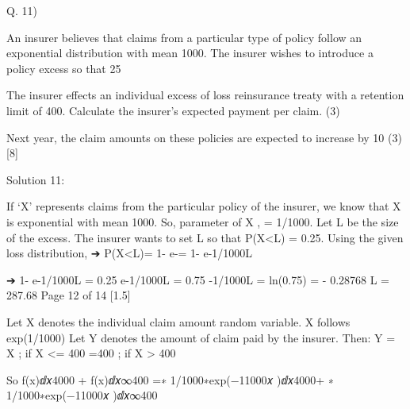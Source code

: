 \documentclass[a4paper,12pt]{article}
\begin{document}

Q. 11)
\item  An insurer believes that claims from a particular type of policy follow an exponential distribution with mean 1000. The insurer wishes to introduce a policy excess so that 25%

\item   The insurer effects an individual excess of loss reinsurance treaty with a retention limit of 400. Calculate the insurer’s expected payment per claim.
(3)
\item   Next year, the claim amounts on these policies are expected to increase by 10%
(3)
[8]

Solution 11:
\item 
If ‘X’ represents claims from the particular policy of the insurer, we know that X is exponential with mean 1000.
So, parameter of X , \lambda= 1/1000.
Let L be the size of the excess. The insurer wants to set L so that P(X<L) = 0.25.
Using the given loss distribution,
➔ P(X<L)= 1- e-\lambdaL = 1- e-1/1000L

➔ 1- e-1/1000L = 0.25
e-1/1000L = 0.75
-1/1000L = ln(0.75)
= - 0.28768
L = 287.68
Page 12 of 14
[1.5]

\item  
Let X denotes the individual claim amount random variable. X follows exp(1/1000)
Let Y denotes the amount of claim paid by the insurer. Then:
Y = X ; if X <= 400
=400 ; if X > 400

So
\intx f(x)ⅆ𝑥4000 + \intx f(x)ⅆ𝑥∞400
=\intx∗ 1/1000∗exp(−11000𝑥 )ⅆ𝑥4000+ ∗ 1/1000∗exp(−11000𝑥 )ⅆ𝑥∞400
\end{document}
